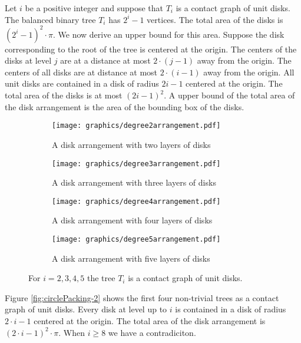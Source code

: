 Let $i$ be a positive integer and suppose that $T_i$ is a contact graph of unit disks.
The balanced binary tree $T_i$ has $2^i -1$ vertices.
The total area of the disks is $\left( 2^i -1 \right)^2 \cdot \pi$.
We now derive an upper bound for this area.
Suppose the disk corresponding to the root of the tree is centered at the origin.
The centers of the disks at level $j$ are at a distance at most $2\cdot (j-1)$ away from the origin.
The centers of all disks are at distance at most $2 \cdot (i -1)$ away from the origin.
All unit disks are contained in a disk of radius $2i-1$ centered at the origin.
The total area of the disks is at most $(2i-1)^2$.  
A upper bound of the total area of the disk arrangement is the area of the bounding box of the disks.

\begin{figure}[!htpb]\label{fig:circlePacking-2}
\begin{center}
  \begin{subfigure}[b]{0.24\textwidth}
	  \texttt{[image: graphics/degree2arrangement.pdf]}
	  \caption{A disk arrangement with two layers of disks}
	  \label{fig:circlePacking2-1}
  \end{subfigure}
  \begin{subfigure}[b]{0.24\textwidth}
	  \texttt{[image: graphics/degree3arrangement.pdf]}
	  \caption{A disk arrangement with three layers of disks}
	  \label{fig:circlePacking2-2}
  \end{subfigure}
  \begin{subfigure}[b]{0.24\textwidth}
	  \texttt{[image: graphics/degree4arrangement.pdf]}
	  \caption{A disk arrangement with four layers of disks}
	  \label{fig:circlePacking2-3}
  \end{subfigure}
  \begin{subfigure}[b]{0.24\textwidth}
	  \texttt{[image: graphics/degree5arrangement.pdf]}
	  \caption{A disk arrangement with five layers of disks}
	  \label{fig:circlePacking2-4}
  \end{subfigure}
\end{center} 
\caption{For $i=2,3,4,5$ the tree $T_i$ is a contact graph of unit disks.}
\end{figure}
Figure \ref{fig:circlePacking-2} shows the first four non-trivial trees as a contact graph of unit disks.
Every disk at level up to $i$ is contained in a disk of radius $2\cdot i - 1$ centered at the origin.
The total area of the disk arrangement is $(2\cdot i -1)^2 \cdot \pi$. 
When $i\geq 8$ we have a contradiciton.

